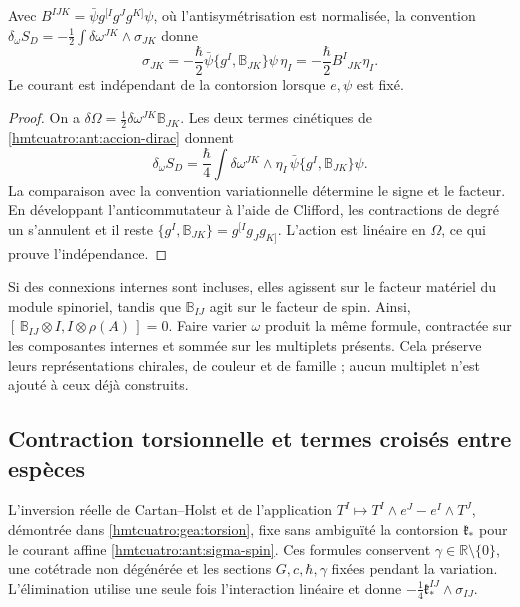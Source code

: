 \begin{proposition}
\label{hmtcuatro:ant:corriente-spin} Avec \(B^{IJK}=\bar\psi g^{[I}g^Jg^{K]}\psi\), où l’antisymétrisation est normalisée, la convention \(\delta_\omega S_D=-\frac12\int\delta\omega^{JK}\wedge\sigma_{JK}\) donne
\begin{equation}
 \sigma_{JK}
 =-\frac{\hbar}{2}\bar\psi\{g^I,\mathbb B_{JK}\}\psi\,\eta_I
 =-\frac{\hbar}{2}B^I{}_{JK}\eta_I .
 \label{hmtcuatro:ant:sigma-spin}
\end{equation}
Le courant est indépendant de la contorsion lorsque \(e,\psi\) est fixé.
\end{proposition}
\begin{proof}
On a \(\delta\Omega=\frac12\delta\omega^{JK}\mathbb B_{JK}\). Les deux termes cinétiques de \eqref{hmtcuatro:ant:accion-dirac} donnent
\[
 \delta_\omega S_D=\frac{\hbar}{4}\int
 \delta\omega^{JK}\wedge\eta_I\,
          \bar\psi\{g^I,\mathbb B_{JK}\}\psi .
\]
La comparaison avec la convention variationnelle détermine le signe et le facteur. En développant l’anticommutateur à l’aide de Clifford, les contractions de degré un s’annulent et il reste \(\{g^I,\mathbb B_{JK}\}=g^{[I}g_Jg_{K]}\). L’action est linéaire en \(\Omega\), ce qui prouve l’indépendance.
\end{proof}

Si des connexions internes sont incluses, elles agissent sur le facteur matériel du module spinoriel, tandis que \(\mathbb B_{IJ}\) agit sur le facteur de spin. Ainsi, \([\,\mathbb B_{IJ}\otimes I,I\otimes\rho(A)\,]=0\). Faire varier \(\omega\) produit la même formule, contractée sur les composantes internes et sommée sur les multiplets présents. Cela préserve leurs représentations chirales, de couleur et de famille ; aucun multiplet n’est ajouté à ceux déjà construits.

\subsection{Contraction torsionnelle et termes croisés entre espèces}
\label{hmtcuatro:ant:contraccion}

L’inversion réelle de Cartan--Holst et de l’application \(T^I\mapsto T^I\wedge e^J-e^I\wedge T^J\), démontrée dans \ref{hmtcuatro:gea:torsion}, fixe sans ambiguïté la contorsion \(\mathfrak k_*\) pour le courant affine \eqref{hmtcuatro:ant:sigma-spin}. Ces formules conservent \(\gamma\in\mathbb R\setminus\{0\}\), une cotétrade non dégénérée et les sections \(G,c,\hbar,\gamma\) fixées pendant la variation. L’élimination utilise une seule fois l’interaction linéaire et donne \(-\frac14\mathfrak k_*^{IJ}\wedge\sigma_{IJ}\).

